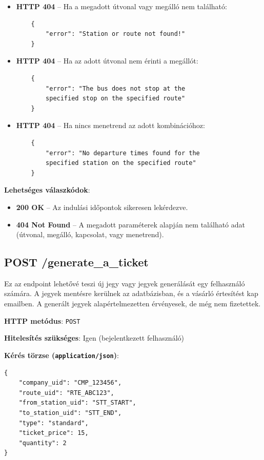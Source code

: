\begin{itemize}
    \item \textbf{HTTP 404} – Ha a megadott útvonal vagy megálló nem található:
    \begin{verbatim}
    {
        "error": "Station or route not found!"
    }
    \end{verbatim}

    \item \textbf{HTTP 404} – Ha az adott útvonal nem érinti a megállót:
    \begin{verbatim}
    {
        "error": "The bus does not stop at the 
        specified stop on the specified route"
    }
    \end{verbatim}

    \item \textbf{HTTP 404} – Ha nincs menetrend az adott kombinációhoz:
    \begin{verbatim}
    {
        "error": "No departure times found for the 
        specified station on the specified route"
    }
    \end{verbatim}
\end{itemize}

\textbf{Lehetséges válaszkódok}:
\begin{itemize}
    \item \textbf{200 OK} – Az indulási időpontok sikeresen lekérdezve.
    \item \textbf{404 Not Found} – A megadott paraméterek alapján nem található adat (útvonal, megálló, kapcsolat, vagy menetrend).
\end{itemize}

\subsection{POST /generate\_a\_ticket}
Ez az endpoint lehetővé teszi új jegy vagy jegyek generálását egy felhasználó számára. A jegyek mentésre kerülnek az adatbázisban, és a vásárló értesítést kap emailben. A generált jegyek alapértelmezetten érvényesek, de még nem fizetettek.

\textbf{HTTP metódus}: \verb|POST|

\textbf{Hitelesítés szükséges}: Igen (bejelentkezett felhasználó)

\textbf{Kérés törzse (\texttt{application/json})}:
\begin{verbatim}
{
    "company_uid": "CMP_123456",
    "route_uid": "RTE_ABC123",
    "from_station_uid": "STT_START",
    "to_station_uid": "STT_END",
    "type": "standard",
    "ticket_price": 15,
    "quantity": 2
}
\end{verbatim}

